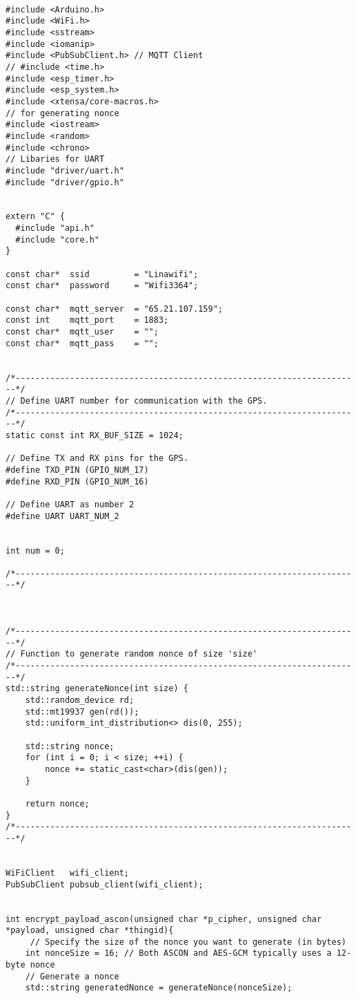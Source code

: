 \begin{lstlisting}[style=CStyle, caption={Main Source C File of The Proposed Implementation}, label={list:mainc-ascon}]

#include <Arduino.h>
#include <WiFi.h>
#include <sstream>
#include <iomanip>
#include <PubSubClient.h> // MQTT Client
// #include <time.h>
#include <esp_timer.h>
#include <esp_system.h>
#include <xtensa/core-macros.h>
// for generating nonce
#include <iostream>
#include <random>
#include <chrono>
// Libaries for UART
#include "driver/uart.h"
#include "driver/gpio.h"


extern "C" {
  #include "api.h"
  #include "core.h"
}

const char*  ssid         = "Linawifi";
const char*  password     = "Wifi3364";

const char*  mqtt_server  = "65.21.107.159";
const int    mqtt_port    = 1883;
const char*  mqtt_user    = "";
const char*  mqtt_pass    = "";


/*----------------------------------------------------------------------*/
// Define UART number for communication with the GPS.
/*----------------------------------------------------------------------*/
static const int RX_BUF_SIZE = 1024;

// Define TX and RX pins for the GPS.
#define TXD_PIN (GPIO_NUM_17)
#define RXD_PIN (GPIO_NUM_16)

// Define UART as number 2
#define UART UART_NUM_2


int num = 0;

/*----------------------------------------------------------------------*/



/*----------------------------------------------------------------------*/
// Function to generate random nonce of size 'size'
/*----------------------------------------------------------------------*/
std::string generateNonce(int size) {
    std::random_device rd;
    std::mt19937 gen(rd());
    std::uniform_int_distribution<> dis(0, 255);

    std::string nonce;
    for (int i = 0; i < size; ++i) {
        nonce += static_cast<char>(dis(gen));
    }

    return nonce;
}
/*----------------------------------------------------------------------*/


WiFiClient   wifi_client;
PubSubClient pubsub_client(wifi_client);


int encrypt_payload_ascon(unsigned char *p_cipher, unsigned char *payload, unsigned char *thingid){
     // Specify the size of the nonce you want to generate (in bytes)
    int nonceSize = 16; // Both ASCON and AES-GCM typically uses a 12-byte nonce
    // Generate a nonce
    std::string generatedNonce = generateNonce(nonceSize);


\end{lstlisting}
